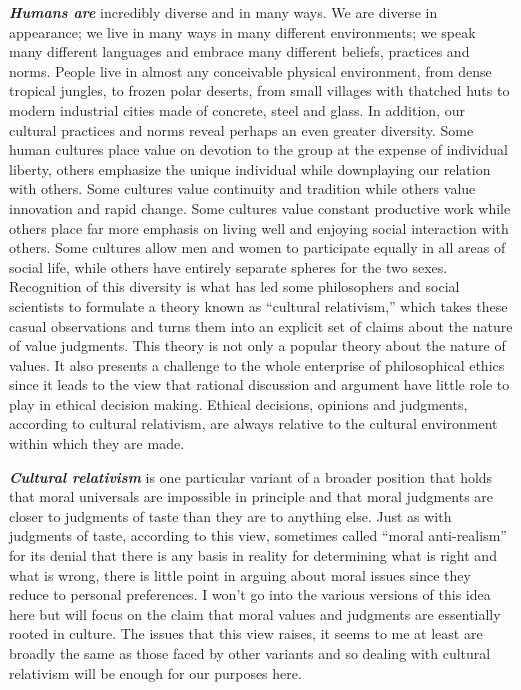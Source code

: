 \documentclass[
  12pt, openany]{book}
\theoremstyle{definition}
\theoremstyle{definition}
\theoremstyle{definition}
\theoremstyle{definition}
\theoremstyle{remark}
\begin{document}
\textbf{\emph{Humans are}} incredibly diverse and in many ways. We are diverse in appearance; we live in many ways in many different environments; we speak many different languages and embrace many different beliefs, practices and norms. People live in almost any conceivable physical environment, from dense tropical jungles, to frozen polar deserts, from small villages with thatched huts to modern industrial cities made of concrete, steel and glass. In addition, our cultural practices and norms reveal perhaps an even greater diversity. Some human cultures place value on devotion to the group at the expense of individual liberty, others emphasize the unique individual while downplaying our relation with others. Some cultures value continuity and tradition while others value innovation and rapid change. Some cultures value constant productive work while others place far more emphasis on living well and enjoying social interaction with others. Some cultures allow men and women to participate equally in all areas of social life, while others have entirely separate spheres for the two sexes. Recognition of this diversity is what has led some philosophers and social scientists to formulate a theory known as ``cultural relativism,'' which takes these casual observations and turns them into an explicit set of claims about the nature of value judgments. This theory is not only a popular theory about the nature of values. It also presents a challenge to the whole enterprise of philosophical ethics since it leads to the view that rational discussion and argument have little role to play in ethical decision making. Ethical decisions, opinions and judgments, according to cultural relativism, are always relative to the cultural environment within which they are made.

\textbf{\emph{Cultural relativism}} is one particular variant of a broader position that holds that moral universals are impossible in principle and that moral judgments are closer to judgments of taste than they are to anything else. Just as with judgments of taste, according to this view, sometimes called ``moral anti-realism'' for its denial that there is any basis in reality for determining what is right and what is wrong, there is little point in arguing about moral issues since they reduce to personal preferences. I won't go into the various versions of this idea here but will focus on the claim that moral values and judgments are essentially rooted in culture. The issues that this view raises, it seems to me at least are broadly the same as those faced by other variants and so dealing with cultural relativism will be enough for our purposes here.
\end{document}
